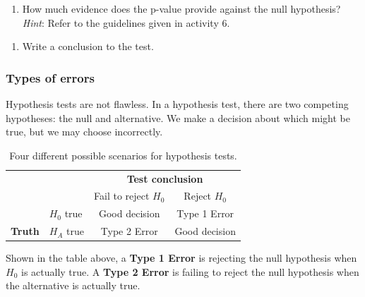 \documentclass[
]{report}
\providecommand{\tightlist}{%
  \setlength{\itemsep}{0pt}\setlength{\parskip}{0pt}}
\begin{document}
\vspace{1in}

\begin{enumerate}
\def\labelenumi{\arabic{enumi}.}
\setcounter{enumi}{20}
\tightlist
\item
  How much evidence does the p-value provide against the null hypothesis? \emph{Hint}: Refer to the guidelines given in activity 6.
\end{enumerate}

\vspace{0.4in}

\begin{enumerate}
\def\labelenumi{\arabic{enumi}.}
\setcounter{enumi}{21}
\tightlist
\item
  Write a conclusion to the test.
\end{enumerate}

\vspace{1in}

\hypertarget{types-of-errors}{%
\subsubsection*{Types of errors}\label{types-of-errors}}

Hypothesis tests are not flawless. In a hypothesis test, there are two competing hypotheses: the null and alternative. We make a decision about which might be true, but we may choose incorrectly.

\begin{table}
\caption{Four different possible scenarios for hypothesis tests.}
\centering
\begin{tabular}[h]{ll|cc}
\hline
 & &  \multicolumn{2}{c}{\textbf{Test conclusion}} \\
 &  & \multicolumn{1}{c}{Fail to reject $H_0$} & \multicolumn{1}{c}{Reject $H_0$}\\
\hline
 & $H_0$ true & Good decision & Type 1 Error\\
\hline
\textbf{Truth} & $H_A$ true & Type 2 Error & Good decision\\
\hline
\end{tabular}
\end{table}

Shown in the table above, a \textbf{Type 1 Error} is rejecting the null hypothesis when \(H_0\) is actually true. A \textbf{Type 2 Error} is failing to reject the null hypothesis when the alternative is actually true.
\end{document}

